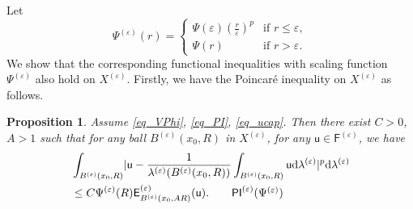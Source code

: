 \documentclass[11pt,a4paper]{article}
\numberwithin{equation}{section}
\theoremstyle{plain}
\newtheorem{proposition}[theorem]{Proposition}
\theoremstyle{definition}
\begin{document}
Let
$$\Psi^{(\varepsilon)}(r)=
\begin{cases}
\Psi(\varepsilon)\left(\frac{r}{\varepsilon}\right)^{p}&\text{if }r\le\varepsilon,\\
\Psi(r)&\text{if }r>\varepsilon.
\end{cases}
$$
We show that the corresponding functional inequalities with scaling function $\Psi^{(\varepsilon)}$ also hold on $X^{(\varepsilon)}$. Firstly, we have the Poincar\'e inequality on $X^{(\varepsilon)}$ as follows.

\begin{proposition}\label{prop_PI_Xeps}
Assume \ref{eq_VPhi}, \ref{eq_PI}, \ref{eq_ucap}. Then there exist $C>0$, $A>1$ such that for any ball $B^{(\varepsilon)}(x_0,R)$ in $X^{(\varepsilon)}$, for any $\mathsf{u}\in\mathsf{F}^{(\varepsilon)}$, we have
\begin{align*}
&\int_{B^{(\varepsilon)}(x_0,R)}\lvert \mathsf{u}-\frac{1}{\lambda^{(\varepsilon)}(B^{(\varepsilon)}(x_0,R))}\int_{B^{(\varepsilon)}(x_0,R)}\mathsf{u}\mathrm{d}\lambda^{(\varepsilon)}\rvert^p\mathrm{d}\lambda^{(\varepsilon)}\\
&\le C\Psi^{(\varepsilon)}(R)\mathsf{E}_{B^{(\varepsilon)}(x_0,AR)}^{(\varepsilon)}(\mathsf{u}).\label{eq_PI_Xeps}\tag*{$\mathsf{PI}^{(\varepsilon)}(\Psi^{(\varepsilon)})$}
\end{align*}
\end{proposition}
\end{document}
